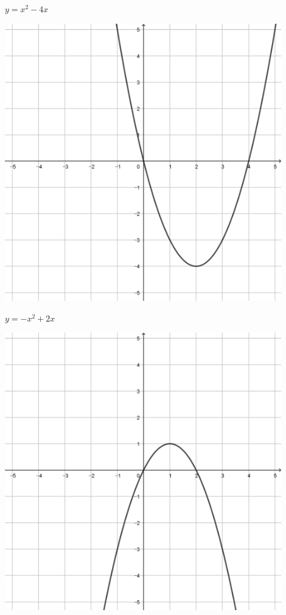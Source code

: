 \documentclass[a4paper]{oblivoir}
\begin{document}
\begin{minipage}{0.45\textwidth}\centering
\(y=x^2-4x\)
\par\bigskip\includegraphics[width=0.9\textwidth]{img/2_quadratic_29}
\end{minipage}
\begin{minipage}{0.45\textwidth}\centering
\(y=-x^2+2x\)
\par\bigskip\includegraphics[width=0.9\textwidth]{img/2_quadratic_30}
\end{minipage}\bigskip\bigskip\par
\end{document}
